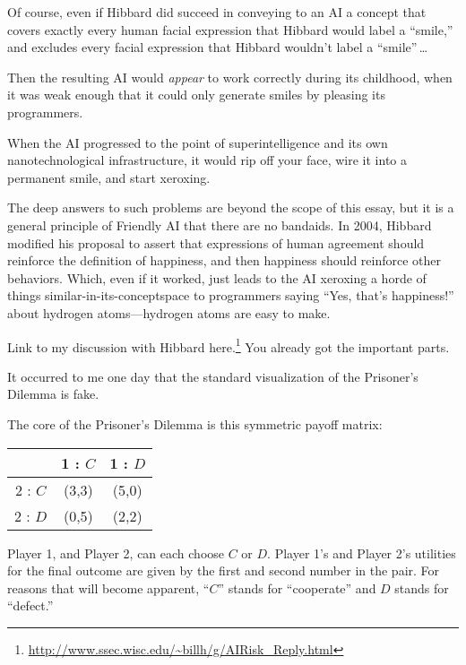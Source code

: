  Of course, even if Hibbard did succeed in conveying to an AI a
concept that covers exactly every human facial expression that Hibbard
would label a ``smile,'' and
excludes every facial expression that Hibbard wouldn't
label a ``smile''\,\ldots


 Then the resulting AI would \textit{appear} to work correctly
during its childhood, when it was weak enough that it could only
generate smiles by pleasing its programmers.


 When the AI progressed to the point of superintelligence and its
own nanotechnological infrastructure, it would rip off your face, wire
it into a permanent smile, and start xeroxing.


 The deep answers to such problems are beyond the scope of this
essay, but it is a general principle of Friendly AI that there are no
bandaids. In 2004, Hibbard modified his proposal to assert that
expressions of human agreement should reinforce the definition of
happiness, and then happiness should reinforce other behaviors. Which,
even if it worked, just leads to the AI xeroxing a horde of things
similar-in-its-conceptspace to programmers saying
``Yes, that's
happiness!'' about hydrogen atoms---hydrogen atoms
are easy to make.


 Link to my discussion with Hibbard here.\footnote{\url{http://www.ssec.wisc.edu/~billh/g/AIRisk_Reply.html}} You already got the
important parts.

\myendsectiontext


\bigskip



 It occurred to me one day that the standard visualization of the
Prisoner's Dilemma is fake. 


 The core of the Prisoner's Dilemma is this
symmetric payoff matrix:

\begin{center}
  \begin{tabular}{|c|c|c|}
    \hline
    &  1 : $C$ & 1 : $D$ \\
    \hline
    2 : $C$ & (3,3) & (5,0) \\
    \hline
    2 : $D$ & (0,5) & (2,2) \\
    \hline
  \end{tabular}
\end{center}


  Player 1, and
Player 2, can each choose $C$ or $D$. Player 1's and Player
2's utilities for the final outcome are given by the
first and second number in the pair. For reasons that will become
apparent, ``$C$'' stands for
``cooperate'' and $D$ stands for
``defect.''


